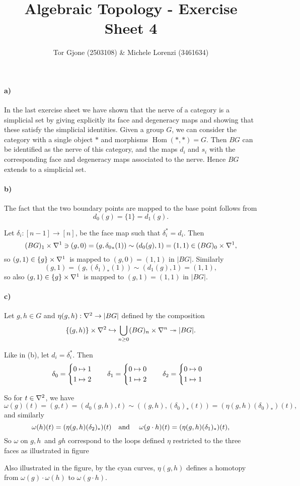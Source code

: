 \documentclass[a4paper,11pt,english]{article}
\title{\textbf{Algebraic Topology} - Exercise Sheet 4}
\author{Tor Gjone (2503108) \& Michele Lorenzi (3461634)}
\begin{document}
\mmaketitle
\begin{exercise}[1]

\paragraph{a)} In the last exercise sheet we have shown that the nerve of a category is a simplicial set by giving explicitly its face and degeneracy maps and showing that these satisfy the simplicial identities. Given a group $G$, we can consider the category with a single object $*$ and morphisms $\operatorname{Hom}(*,*)=G$. Then $BG$ can be identified as the nerve of this category, and the maps $d_i$ and $s_i$ with the corresponding face and degeneracy maps associated to the nerve. Hence $BG$ extends to a simplicial set.

\paragraph{b)} The fact that the two boundary points are mapped to the base point follows from
\[ d_0(g) = \{1\} = d_1(g). \]

Let $\delta_i: [n-1] \to [n]$, be the face map such that $\delta_i^* = d_i$.
Then
\[ (BG)_1 \times \nabla^1 \ni (g,0) = (g,{\delta_0}_*(1)) \sim (d_0(g),1) = (1,1)
\in (BG)_0\times \nabla^1, \]
so $(g,1) \in \{g\}\times \nabla^1$ is mapped to $(g,0) = (1,1)$ in $|BG|$.
Similarly
\[ (g,1) = (g,(\delta_1)_*(1)) \sim (d_1(g),1) = (1,1), \]
so also $(g,1) \in \{g\}\times \nabla^1$ is mapped to $(g,1) = (1,1)$ in $|BG|$.

\paragraph{c)} Let $g,h \in G$ and $\eta(g,h) : \nabla^2 \to |BG|$ defined by the composition
\[ \{ (g,h) \}\times \nabla^2 \hookrightarrow \bigcup_{n\ge 0} (BG)_n \times \nabla^n \twoheadrightarrow
|BG|. \]

Like in (b), let $d_i = \delta_i^*$. Then
\[
\delta_0= \begin{cases} 0\mapsto 1 \\ 1 \mapsto 2 \end{cases} \quad
\delta_1= \begin{cases} 0\mapsto 0 \\ 1 \mapsto 2 \end{cases} \quad
\delta_2= \begin{cases} 0\mapsto 0 \\ 1 \mapsto 1 \end{cases}
\]

So for $t\in \nabla^2$, we have
\[ \omega(g)(t) = (g,t) = (d_0(g,h), t) \sim
((g,h),(\delta_0)_*(t)) = (\eta(g,h) (\delta_0)_*)(t), \]
and similarly
\[ \omega(h)(t) = (\eta(g,h) (\delta_2)_*)(t) \quad\text{and }\quad
\omega(g\cdot h)(t) = (\eta(g,h) (\delta_1)_*)(t), \]
So $\omega$ on $g,h$ and $gh$ correspond to the loops defined $\eta$ restricted
to the three faces as illustrated in figure 

\begin{figure}
\caption{}
\label{fig:1}
\centering

\end{figure}

Also illustrated in the figure, by the cyan curves, $\eta(g,h)$ defines a
homotopy from $\omega(g)\cdot \omega(h)$ to $\omega(g\cdot h)$.

\end{exercise}
\end{document}
